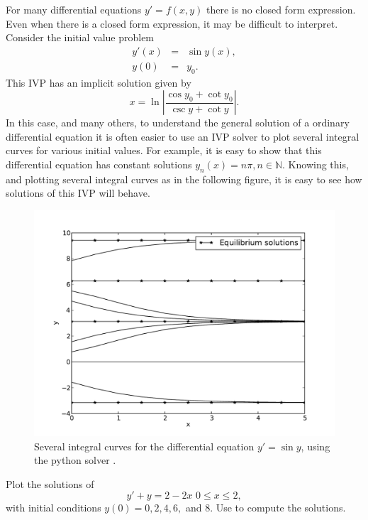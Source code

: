 For many differential equations $y' = f(x,y)$ there is no closed form expression. Even when there is a closed form expression, it may be difficult to interpret. Consider the initial value problem 
\begin{eqnarray*}
y'(x) &=& \sin y(x), \\
y(0) &=& y_0.
\end{eqnarray*}
This IVP has an implicit solution given by 
\[x = \ln \left|\frac{\cos y_0 + \cot y_0}{\csc y + \cot y} \right|.\]
In this case, and many others, to understand the general solution of a ordinary differential equation it is often easier to use an IVP solver to plot several integral curves for various initial values. For example, it is easy to show that this differential equation has constant solutions $y_n(x) = n \pi, n \in \mathbb{N}$. Knowing this, and plotting several integral curves as in the following figure, it is easy to see how solutions of this IVP will behave.


\begin{figure}
\centering
\includegraphics[width=\textwidth]{Fig4.pdf}
\caption{Several integral curves for the differential equation $y' =\sin y$, using the python solver . }
\label{ivp:int_curves}
\end{figure}

\begin{problem}
Plot the solutions of 
\[ y' + y = 2-2x\,\, 0 \leq x \leq 2, \] 
with initial conditions $y(0) = 0, 2, 4, 6, $ and $8$. Use   to compute the solutions. 
\end{problem}



%
%
%
